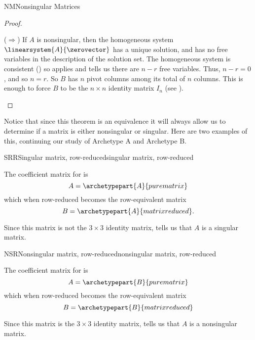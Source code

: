 \begin{subsect}{NM}{Nonsingular Matrices}
\begin{proof}
%
\begin{para}($\Rightarrow$)  If $A$ is nonsingular, then the homogeneous system $\linearsystem{A}{\zerovector}$ has a unique solution, and has no free variables in the description of the solution set.  The homogeneous system is consistent () so   applies and tells us there are $n-r$ free variables.  Thus, $n-r=0$, and so $n=r$.  So $B$ has $n$ pivot columns among its total of $n$ columns.  This is enough to force $B$ to be the $n\times n$ identity matrix $I_n$ (see ).\end{para}
\end{proof}
%
\begin{para}Notice that since this theorem is an equivalence it will always allow us to determine if a matrix is either nonsingular or singular.  Here are two examples of this, continuing our study of Archetype A and Archetype B.\end{para}
%
\begin{example}{SRR}{Singular matrix, row-reduced}{singular matrix, row-reduced}
\begin{para}The coefficient matrix for  is
%
\begin{equation*}
A=\archetypepart{A}{purematrix}\end{equation*}
%
which when row-reduced becomes the row-equivalent matrix
%
\begin{equation*}
B=\archetypepart{A}{matrixreduced}.\end{equation*}
\end{para}
%
\begin{para}Since this matrix is not the $3\times 3$ identity matrix,  tells us that $A$ is a singular matrix.\end{para}
\end{example}
%
\begin{example}{NSR}{Nonsingular matrix, row-reduced}{nonsingular matrix, row-reduced}
\begin{para}The coefficient matrix for  is
%
\begin{equation*}
A=\archetypepart{B}{purematrix}\end{equation*}
%
which when row-reduced becomes the row-equivalent matrix
%
\begin{equation*}
B=\archetypepart{B}{matrixreduced}\end{equation*}\end{para}
%
\begin{para}Since this matrix is the $3\times 3$ identity matrix,  tells us that $A$ is a nonsingular matrix.\end{para}
\end{example}
%
\end{subsect}
